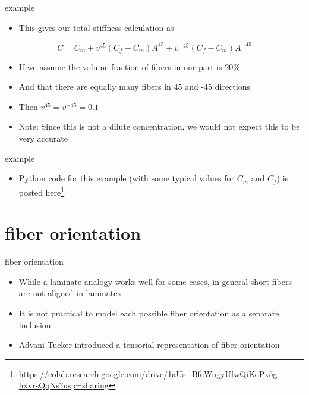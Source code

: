 \documentclass[
  letterpaper,
  ignorenonframetext,
  aspectratio=43,
  handout,
  12pt]{beamer}
\DeclareRobustCommand{\href}[2]{#2\footnote{\url{#1}}}
\providecommand{\tightlist}{%
  \setlength{\itemsep}{0pt}\setlength{\parskip}{0pt}}
\providecommand{\tightlist}{%
\setlength{\itemsep}{0pt}\setlength{\parskip}{0pt}}
\begin{document}
\begin{frame}{example}
\protect\hypertarget{example-3}{}
\begin{itemize}
\tightlist
\item
  This gives our total stiffness calculation as
\end{itemize}

\[C = C_m + v^{45}(C_f-C_m)A^{45} + v^{-45}(C_f-C_m)A^{-45}\]

\begin{itemize}
\tightlist
\item
  If we assume the volume fraction of fibers in our part is 20\%
\item
  And that there are equally many fibers in 45 and -45 directions
\item
  Then \(v^{45} = v^{-45} = 0.1\)
\item
  Note: Since this is not a dilute concentration, we would not expect
  this to be very accurate
\end{itemize}
\end{frame}

\begin{frame}{example}
\protect\hypertarget{example-4}{}
\begin{itemize}
\tightlist
\item
  Python code for this example (with some typical values for \(C_m\) and
  \(C_f\)) is posted
  \href{https://colab.research.google.com/drive/1aUs_BfeWugyUfwQiKoPx5g-hxvrsQqNs?usp=sharing}{here}
\end{itemize}
\end{frame}

\hypertarget{fiber-orientation-1}{%
\section{fiber orientation}\label{fiber-orientation-1}}

\begin{frame}{fiber orientation}
\protect\hypertarget{fiber-orientation-2}{}
\begin{itemize}
\tightlist
\item
  While a laminate analogy works well for some cases, in general short
  fibers are not aligned in laminates
\item
  It is not practical to model each possible fiber orientation as a
  separate inclusion
\item
  Advani-Tucker introduced a tensorial representation of fiber
  orientation
\end{itemize}
\end{frame}
\end{document}
